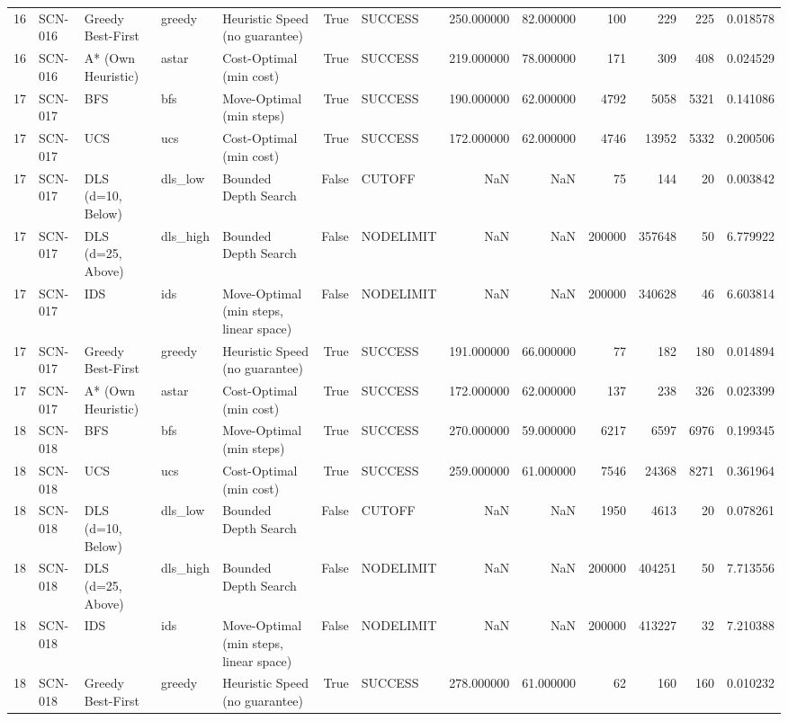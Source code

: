 \begin{table}[htbp]
\begin{tabular}{rllllrlrrrrrr}
16 & SCN-016 & Greedy Best-First & greedy & Heuristic Speed (no guarantee) & True & SUCCESS & 250.000000 & 82.000000 & 100 & 229 & 225 & 0.018578 \\
16 & SCN-016 & A* (Own Heuristic) & astar & Cost-Optimal (min cost) & True & SUCCESS & 219.000000 & 78.000000 & 171 & 309 & 408 & 0.024529 \\
17 & SCN-017 & BFS & bfs & Move-Optimal (min steps) & True & SUCCESS & 190.000000 & 62.000000 & 4792 & 5058 & 5321 & 0.141086 \\
17 & SCN-017 & UCS & ucs & Cost-Optimal (min cost) & True & SUCCESS & 172.000000 & 62.000000 & 4746 & 13952 & 5332 & 0.200506 \\
17 & SCN-017 & DLS (d=10, Below) & dls\_low & Bounded Depth Search & False & CUTOFF & NaN & NaN & 75 & 144 & 20 & 0.003842 \\
17 & SCN-017 & DLS (d=25, Above) & dls\_high & Bounded Depth Search & False & NODELIMIT & NaN & NaN & 200000 & 357648 & 50 & 6.779922 \\
17 & SCN-017 & IDS & ids & Move-Optimal (min steps, linear space) & False & NODELIMIT & NaN & NaN & 200000 & 340628 & 46 & 6.603814 \\
17 & SCN-017 & Greedy Best-First & greedy & Heuristic Speed (no guarantee) & True & SUCCESS & 191.000000 & 66.000000 & 77 & 182 & 180 & 0.014894 \\
17 & SCN-017 & A* (Own Heuristic) & astar & Cost-Optimal (min cost) & True & SUCCESS & 172.000000 & 62.000000 & 137 & 238 & 326 & 0.023399 \\
18 & SCN-018 & BFS & bfs & Move-Optimal (min steps) & True & SUCCESS & 270.000000 & 59.000000 & 6217 & 6597 & 6976 & 0.199345 \\
18 & SCN-018 & UCS & ucs & Cost-Optimal (min cost) & True & SUCCESS & 259.000000 & 61.000000 & 7546 & 24368 & 8271 & 0.361964 \\
18 & SCN-018 & DLS (d=10, Below) & dls\_low & Bounded Depth Search & False & CUTOFF & NaN & NaN & 1950 & 4613 & 20 & 0.078261 \\
18 & SCN-018 & DLS (d=25, Above) & dls\_high & Bounded Depth Search & False & NODELIMIT & NaN & NaN & 200000 & 404251 & 50 & 7.713556 \\
18 & SCN-018 & IDS & ids & Move-Optimal (min steps, linear space) & False & NODELIMIT & NaN & NaN & 200000 & 413227 & 32 & 7.210388 \\
18 & SCN-018 & Greedy Best-First & greedy & Heuristic Speed (no guarantee) & True & SUCCESS & 278.000000 & 61.000000 & 62 & 160 & 160 & 0.010232 \\

\end{tabular}
\end{table}
